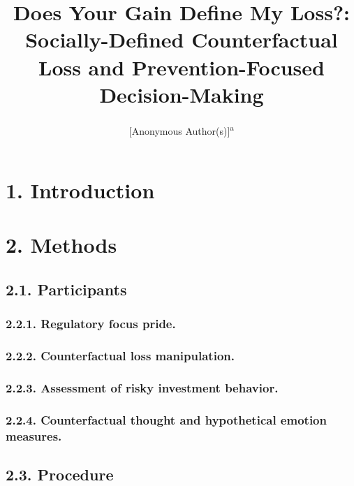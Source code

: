 \documentclass[man,floatsintext]{apa6}
\title{Does Your Gain Define My Loss?: Socially-Defined Counterfactual Loss and Prevention-Focused Decision-Making}
\author{{[}Anonymous Author(s){]}\textsuperscript{a}}
\date{}
\affiliation{
\vspace{0.5cm}
\textsuperscript{a} [Anonymized Institution(s)]}
\begin{document}
\maketitle

\hypertarget{introduction}{%
\section{1. Introduction}\label{introduction}}

\hypertarget{methods}{%
\section{2. Methods}\label{methods}}

\hypertarget{participants}{%
\subsection{2.1. Participants}\label{participants}}

\hypertarget{regulatory-focus-pride.}{%
\subsubsection{2.2.1. Regulatory focus pride.}\label{regulatory-focus-pride.}}

\hypertarget{counterfactual-loss-manipulation.}{%
\subsubsection{2.2.2. Counterfactual loss manipulation.}\label{counterfactual-loss-manipulation.}}

\hypertarget{assessment-of-risky-investment-behavior.}{%
\subsubsection{2.2.3. Assessment of risky investment behavior.}\label{assessment-of-risky-investment-behavior.}}

\hypertarget{counterfactual-thought-and-hypothetical-emotion-measures.}{%
\subsubsection{2.2.4. Counterfactual thought and hypothetical emotion measures.}\label{counterfactual-thought-and-hypothetical-emotion-measures.}}

\hypertarget{procedure}{%
\subsection{2.3. Procedure}\label{procedure}}
\end{document}
